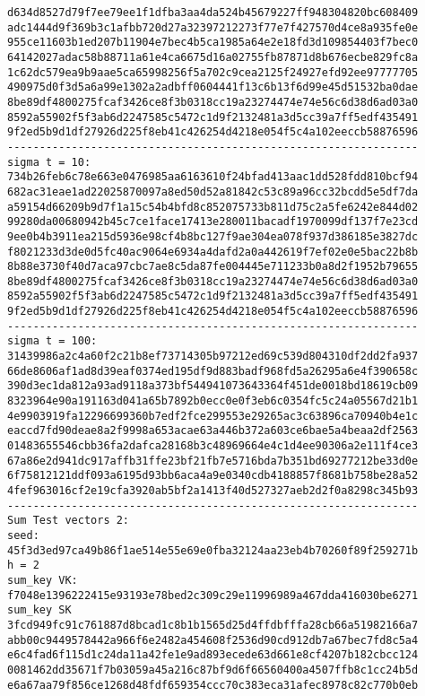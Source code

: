 \documentclass{article}
\begin{document}
{\begin{verbatim}
d634d8527d79f7ee79ee1f1dfba3aa4da524b45679227ff948304820bc608409
adc1444d9f369b3c1afbb720d27a32397212273f77e7f427570d4ce8a935fe0e
955ce11603b1ed207b11904e7bec4b5ca1985a64e2e18fd3d109854403f7bec0
64142027adac58b88711a61e4ca6675d16a02755fb87871d8b676ecbe829fc8a
1c62dc579ea9b9aae5ca65998256f5a702c9cea2125f24927efd92ee97777705
490975d0f3d5a6a99e1302a2adbff0604441f13c6b13f6d99e45d51532ba0dae
8be89df4800275fcaf3426ce8f3b0318cc19a23274474e74e56c6d38d6ad03a0
8592a55902f5f3ab6d2247585c5472c1d9f2132481a3d5cc39a7ff5edf435491
9f2ed5b9d1df27926d225f8eb41c426254d4218e054f5c4a102eeccb58876596
----------------------------------------------------------------
sigma t = 10:
734b26feb6c78e663e0476985aa6163610f24bfad413aac1dd528fdd810bcf94
682ac31eae1ad22025870097a8ed50d52a81842c53c89a96cc32bcdd5e5df7da
a59154d66209b9d7f1a15c54b4bfd8c852075733b811d75c2a5fe6242e844d02
99280da00680942b45c7ce1face17413e280011bacadf1970099df137f7e23cd
9ee0b4b3911ea215d5936e98cf4b8bc127f9ae304ea078f937d386185e3827dc
f8021233d3de0d5fc40ac9064e6934a4dafd2a0a442619f7ef02e0e5bac22b8b
8b88e3730f40d7aca97cbc7ae8c5da87fe004445e711233b0a8d2f1952b79655
8be89df4800275fcaf3426ce8f3b0318cc19a23274474e74e56c6d38d6ad03a0
8592a55902f5f3ab6d2247585c5472c1d9f2132481a3d5cc39a7ff5edf435491
9f2ed5b9d1df27926d225f8eb41c426254d4218e054f5c4a102eeccb58876596
----------------------------------------------------------------
sigma t = 100:
31439986a2c4a60f2c21b8ef73714305b97212ed69c539d804310df2dd2fa937
66de8606af1ad8d39eaf0374ed195df9d883badf968fd5a26295a6e4f390658c
390d3ec1da812a93ad9118a373bf544941073643364f451de0018bd18619cb09
8323964e90a191163d041a65b7892b0ecc0e0f3eb6c0354fc5c24a05567d21b1
4e9903919fa12296699360b7edf2fce299553e29265ac3c63896ca70940b4e1c
eaccd7fd90deae8a2f9998a653acae63a446b372a603ce6bae5a4beaa2df2563
01483655546cbb36fa2dafca28168b3c48969664e4c1d4ee90306a2e111f4ce3
67a86e2d941dc917affb31ffe23bf21fb7e5716bda7b351bd69277212be33d0e
6f75812121ddf093a6195d93bb6aca4a9e0340cdb4188857f8681b758be28a52
4fef963016cf2e19cfa3920ab5bf2a1413f40d527327aeb2d2f0a8298c345b93
----------------------------------------------------------------
Sum Test vectors 2:
seed:
45f3d3ed97ca49b86f1ae514e55e69e0fba32124aa23eb4b70260f89f259271b
h = 2
sum_key VK:
f7048e1396222415e93193e78bed2c309c29e11996989a467dda416030be6271
sum_key SK
3fcd949fc91c761887d8bcad1c8b1b1565d25d4ffdbfffa28cb66a51982166a7
abb00c9449578442a966f6e2482a454608f2536d90cd912db7a67bec7fd8c5a4
e6c4fad6f115d1c24da11a42fe1e9ad893ecede63d661e8cf4207b182cbcc124
0081462dd35671f7b03059a45a216c87bf9d6f66560400a4507ffb8c1cc24b5d
e6a67aa79f856ce1268d48fdf659354ccc70c383eca31afec8978c82c770b0eb

\end{verbatim}}
\end{document}
